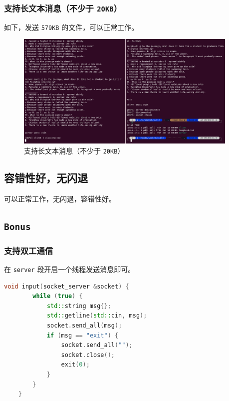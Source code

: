 \documentclass{article}
\begin{document}
\subsubsection{支持长文本消息（不少于 \texttt{20KB}）}

如下，发送 \texttt{579KB} 的文件，可以正常工作。

\begin{figure}[H]
    \centering
    \includegraphics[width=0.95\textwidth]{img/8.png}
    \caption{支持长文本消息（不少于 \texttt{20KB}）}
\end{figure}

\subsection{容错性好，无闪退}

可以正常工作，无闪退，容错性好。

\subsection{\texttt{Bonus}}

\subsubsection{支持双工通信}

在 \texttt{server} 段开启一个线程发送消息即可。

\begin{lstlisting}[language=C++]
    void input(socket_server &socket) {
        while (true) {
            std::string msg{};
            std::getline(std::cin, msg);
            socket.send_all(msg);
            if (msg == "exit") {
                socket.send_all("");
                socket.close();
                exit(0);
            }
        }
    }    
\end{lstlisting}
\end{document}
